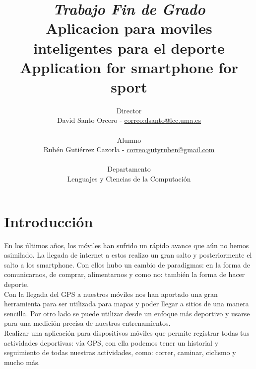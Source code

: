 \documentclass[a4paper, 11pt]{article}
\begin{document}
  \title{\emph{Trabajo Fin de Grado} \\
   Aplicacion para moviles inteligentes para el deporte\\
   Application for smartphone for sport\\
  }
  \author{
   Director \\ David Santo Orcero - \url{correo:dsanto@lcc.uma.es} \\ \\
   Alumno \\ Rubén Gutiérrez Cazorla - \url{correo:gutyruben@gmail.com}\\ \\
   Departamento \\Lenguajes y Ciencias de la Computación
   }
  \maketitle


  \thispagestyle{empty}

%

\section{Introducción}

      En los últimos años, los móviles han sufrido un rápido avance que aún no hemos
      asimilado. La llegada de internet a estos realizo un gran salto y posteriormente
      el salto a los smartphone. Con ellos hubo un cambio de paradigmas: en la forma
      de comunicarnos, de comprar, alimentarnos y como no: también la forma de hacer
      deporte.\\

      Con la llegada del GPS a nuestros móviles nos han aportado una gran herramienta
      para ser utilizada para mapas y poder llegar a sitios de una manera sencilla.
      Por otro lado se puede utilizar desde un enfoque más deportivo y usarse para una
      medición precisa de nuestros entrenamientos.\\

      Realizar una aplicación para dispositivos móviles que permite registrar todas
      tus actividades deportivas: vía GPS, con ella podemos tener un historial y
      seguimiento de todas nuestras actividades, como: correr, caminar, ciclismo y
      mucho más.\\
\end{document}
